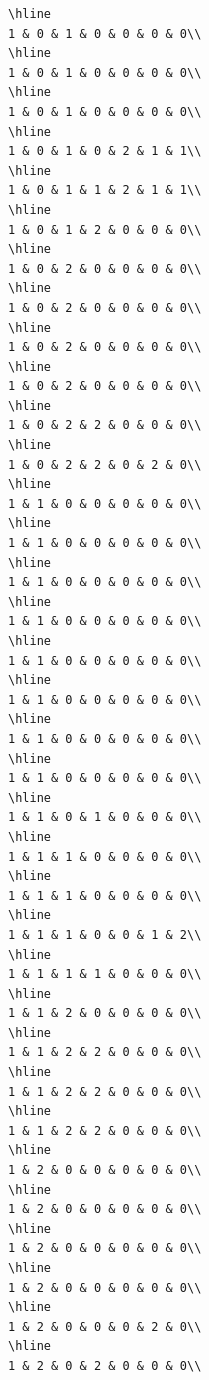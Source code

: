 \documentclass[
]{article}
\begin{document}
\begin{verbatim}
\hline
1 & 0 & 1 & 0 & 0 & 0 & 0\\
\hline
1 & 0 & 1 & 0 & 0 & 0 & 0\\
\hline
1 & 0 & 1 & 0 & 0 & 0 & 0\\
\hline
1 & 0 & 1 & 0 & 2 & 1 & 1\\
\hline
1 & 0 & 1 & 1 & 2 & 1 & 1\\
\hline
1 & 0 & 1 & 2 & 0 & 0 & 0\\
\hline
1 & 0 & 2 & 0 & 0 & 0 & 0\\
\hline
1 & 0 & 2 & 0 & 0 & 0 & 0\\
\hline
1 & 0 & 2 & 0 & 0 & 0 & 0\\
\hline
1 & 0 & 2 & 0 & 0 & 0 & 0\\
\hline
1 & 0 & 2 & 2 & 0 & 0 & 0\\
\hline
1 & 0 & 2 & 2 & 0 & 2 & 0\\
\hline
1 & 1 & 0 & 0 & 0 & 0 & 0\\
\hline
1 & 1 & 0 & 0 & 0 & 0 & 0\\
\hline
1 & 1 & 0 & 0 & 0 & 0 & 0\\
\hline
1 & 1 & 0 & 0 & 0 & 0 & 0\\
\hline
1 & 1 & 0 & 0 & 0 & 0 & 0\\
\hline
1 & 1 & 0 & 0 & 0 & 0 & 0\\
\hline
1 & 1 & 0 & 0 & 0 & 0 & 0\\
\hline
1 & 1 & 0 & 0 & 0 & 0 & 0\\
\hline
1 & 1 & 0 & 1 & 0 & 0 & 0\\
\hline
1 & 1 & 1 & 0 & 0 & 0 & 0\\
\hline
1 & 1 & 1 & 0 & 0 & 0 & 0\\
\hline
1 & 1 & 1 & 0 & 0 & 1 & 2\\
\hline
1 & 1 & 1 & 1 & 0 & 0 & 0\\
\hline
1 & 1 & 2 & 0 & 0 & 0 & 0\\
\hline
1 & 1 & 2 & 2 & 0 & 0 & 0\\
\hline
1 & 1 & 2 & 2 & 0 & 0 & 0\\
\hline
1 & 1 & 2 & 2 & 0 & 0 & 0\\
\hline
1 & 2 & 0 & 0 & 0 & 0 & 0\\
\hline
1 & 2 & 0 & 0 & 0 & 0 & 0\\
\hline
1 & 2 & 0 & 0 & 0 & 0 & 0\\
\hline
1 & 2 & 0 & 0 & 0 & 0 & 0\\
\hline
1 & 2 & 0 & 0 & 0 & 2 & 0\\
\hline
1 & 2 & 0 & 2 & 0 & 0 & 0\\

\end{verbatim}
\end{document}
